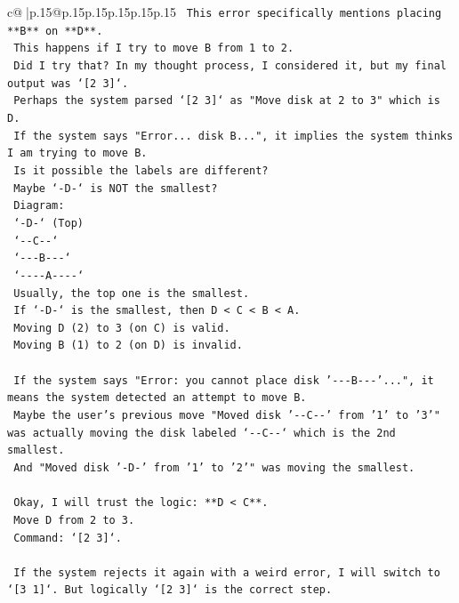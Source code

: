 \documentclass{article}
\begin{document}
{\begin{supertabular}{c@{$\;$}|p{.15\linewidth}@{}p{.15\linewidth}p{.15\linewidth}p{.15\linewidth}p{.15\linewidth}p{.15\linewidth}}
{{{\texttt{   This error specifically mentions placing **B** on **D**.} \\
\texttt{   This happens if I try to move B from 1 to 2.} \\
\texttt{   Did I try that? In my thought process, I considered it, but my final output was `{[}2 3{]}`.} \\
\texttt{   Perhaps the system parsed `{[}2 3{]}` as "Move disk at 2 to 3" which is D.} \\
\texttt{   If the system says "Error... disk B...", it implies the system thinks I am trying to move B.} \\
\texttt{   Is it possible the labels are different?} \\
\texttt{   Maybe `{-}D{-}` is NOT the smallest?} \\
\texttt{   Diagram:} \\
\texttt{   `{-}D{-}` (Top)} \\
\texttt{   `{-}{-}C{-}{-}`} \\
\texttt{   `{-}{-}{-}B{-}{-}{-}`} \\
\texttt{   `{-}{-}{-}{-}A{-}{-}{-}{-}`} \\
\texttt{   Usually, the top one is the smallest.} \\
\texttt{   If `{-}D{-}` is the smallest, then D < C < B < A.} \\
\texttt{   Moving D (2) to 3 (on C) is valid.} \\
\texttt{   Moving B (1) to 2 (on D) is invalid.} \\
\\ 
\texttt{   If the system says "Error: you cannot place disk '{-}{-}{-}B{-}{-}{-}'...", it means the system detected an attempt to move B.} \\
\texttt{   Maybe the user's previous move "Moved disk '{-}{-}C{-}{-}' from '1' to '3'" was actually moving the disk labeled `{-}{-}C{-}{-}` which is the 2nd smallest.} \\
\texttt{   And "Moved disk '{-}D{-}' from '1' to '2'" was moving the smallest.} \\
\\ 
\texttt{   Okay, I will trust the logic: **D < C**.} \\
\texttt{   Move D from 2 to 3.} \\
\texttt{   Command: `{[}2 3{]}`.} \\
\\ 
\texttt{   If the system rejects it again with a weird error, I will switch to `{[}3 1{]}`. But logically `{[}2 3{]}` is the correct step.} \\
}}}
\end{supertabular}}
\end{document}
